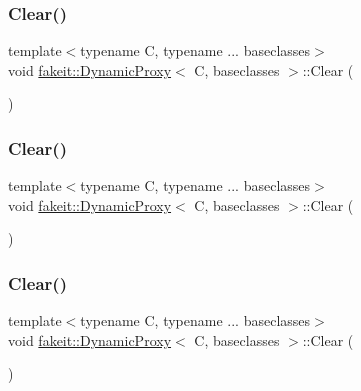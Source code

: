 \subsubsection{\texorpdfstring{Clear()}{Clear()}\hspace{0.1cm}{\footnotesize\ttfamily [1/9]}}
{\footnotesize\ttfamily template$<$typename C, typename ... baseclasses$>$ \\
void \mbox{\hyperlink{structfakeit_1_1DynamicProxy}{fakeit\+::\+Dynamic\+Proxy}}$<$ C, baseclasses $>$\+::Clear (\begin{DoxyParamCaption}{ }\end{DoxyParamCaption})\hspace{0.3cm}{\ttfamily [inline]}}

\mbox{\label{structfakeit_1_1DynamicProxy_a995c7e3dd97dc7707f18774eb4554b45}} 
\subsubsection{\texorpdfstring{Clear()}{Clear()}\hspace{0.1cm}{\footnotesize\ttfamily [2/9]}}
{\footnotesize\ttfamily template$<$typename C, typename ... baseclasses$>$ \\
void \mbox{\hyperlink{structfakeit_1_1DynamicProxy}{fakeit\+::\+Dynamic\+Proxy}}$<$ C, baseclasses $>$\+::Clear (\begin{DoxyParamCaption}{ }\end{DoxyParamCaption})\hspace{0.3cm}{\ttfamily [inline]}}

\mbox{\label{structfakeit_1_1DynamicProxy_a995c7e3dd97dc7707f18774eb4554b45}} 
\subsubsection{\texorpdfstring{Clear()}{Clear()}\hspace{0.1cm}{\footnotesize\ttfamily [3/9]}}
{\footnotesize\ttfamily template$<$typename C, typename ... baseclasses$>$ \\
void \mbox{\hyperlink{structfakeit_1_1DynamicProxy}{fakeit\+::\+Dynamic\+Proxy}}$<$ C, baseclasses $>$\+::Clear (\begin{DoxyParamCaption}{ }\end{DoxyParamCaption})\hspace{0.3cm}{\ttfamily [inline]}}

